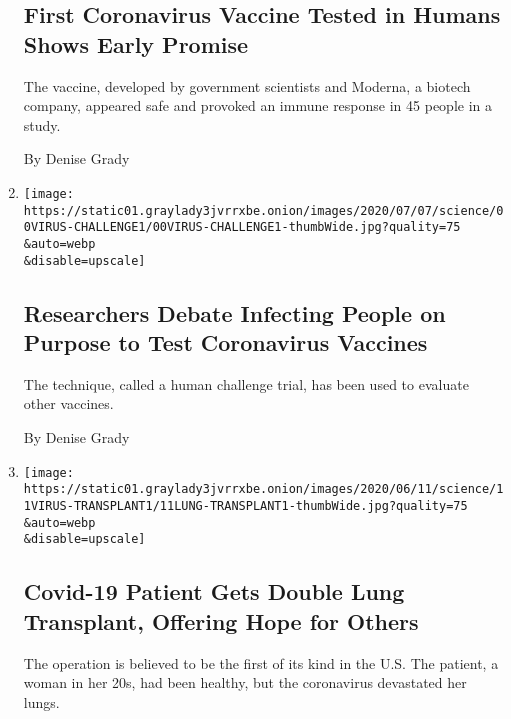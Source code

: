 \begin{enumerate}
  \hypertarget{first-coronavirus-vaccine-tested-in-humans-shows-early-promise}{%
  \subsection{First Coronavirus Vaccine Tested in Humans Shows Early
  Promise}\label{first-coronavirus-vaccine-tested-in-humans-shows-early-promise}}

  The vaccine, developed by government scientists and Moderna, a biotech
  company, appeared safe and provoked an immune response in 45 people in
  a study.

  By Denise Grady
\item
  \href{/2020/07/01/health/coronavirus-vaccine-trials.html}{}

  \texttt{[image: https://static01.graylady3jvrrxbe.onion/images/2020/07/07/science/00VIRUS-CHALLENGE1/00VIRUS-CHALLENGE1-thumbWide.jpg?quality=75\\\&auto=webp\\\&disable=upscale]}

  \hypertarget{researchers-debate-infecting-people-on-purpose-to-test-coronavirus-vaccines}{%
  \subsection{Researchers Debate Infecting People on Purpose to Test
  Coronavirus
  Vaccines}\label{researchers-debate-infecting-people-on-purpose-to-test-coronavirus-vaccines}}

  The technique, called a human challenge trial, has been used to
  evaluate other vaccines.

  By Denise Grady
\item
  \href{/2020/06/11/health/coronavirus-lung-transplant.html}{}

  \texttt{[image: https://static01.graylady3jvrrxbe.onion/images/2020/06/11/science/11VIRUS-TRANSPLANT1/11LUNG-TRANSPLANT1-thumbWide.jpg?quality=75\\\&auto=webp\\\&disable=upscale]}

  \hypertarget{covid-19-patient-gets-double-lung-transplant-offering-hope-for-others}{%
  \subsection{Covid-19 Patient Gets Double Lung Transplant, Offering
  Hope for
  Others}\label{covid-19-patient-gets-double-lung-transplant-offering-hope-for-others}}

  The operation is believed to be the first of its kind in the U.S. The
  patient, a woman in her 20s, had been healthy, but the coronavirus
  devastated her lungs.


\end{enumerate}
